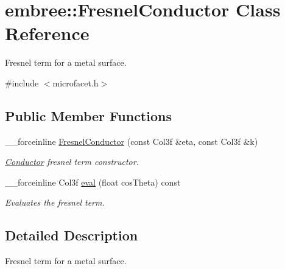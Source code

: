 \hypertarget{classembree_1_1_fresnel_conductor}{
\section{embree::FresnelConductor Class Reference}
\label{classembree_1_1_fresnel_conductor}
}


Fresnel term for a metal surface.  




{\ttfamily \#include $<$microfacet.h$>$}

\subsection*{Public Member Functions}
\begin{DoxyCompactItemize}
\item 
\_\-\_\-forceinline \hyperlink{classembree_1_1_fresnel_conductor_ab2bf5b4cbc8349d83d84fef546692505}{FresnelConductor} (const Col3f \&eta, const Col3f \&k)
\begin{DoxyCompactList}\small\item\em \hyperlink{classembree_1_1_conductor}{Conductor} fresnel term constructor. \item\end{DoxyCompactList}\item 
\_\-\_\-forceinline Col3f \hyperlink{classembree_1_1_fresnel_conductor_aafcdbdb2f0e663c565b1aa556efd71eb}{eval} (float cosTheta) const 
\begin{DoxyCompactList}\small\item\em Evaluates the fresnel term. \item\end{DoxyCompactList}\end{DoxyCompactItemize}


\subsection{Detailed Description}
Fresnel term for a metal surface. 

